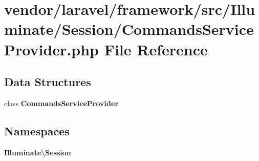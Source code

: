 \section{vendor/laravel/framework/src/\+Illuminate/\+Session/\+Commands\+Service\+Provider.php File Reference}
\label{_commands_service_provider_8php}
\subsection*{Data Structures}
\begin{DoxyCompactItemize}
\item 
class {\bf Commands\+Service\+Provider}
\end{DoxyCompactItemize}
\subsection*{Namespaces}
\begin{DoxyCompactItemize}
\item 
 {\bf Illuminate\textbackslash{}\+Session}
\end{DoxyCompactItemize}
